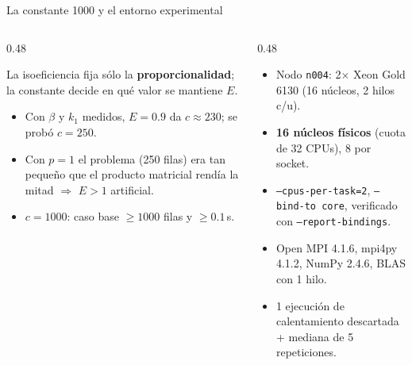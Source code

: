 \documentclass[10pt, aspectratio=169]{beamer}
\newcommand{\cajaInfo}[2]{%
  {\setlength{\fboxsep}{6pt}%
   \colorbox{UTECDarkBlue!5}{\begin{minipage}{\dimexpr#1-2\fboxsep\relax}#2\end{minipage}}}%
}
\newcommand{\cajaAcento}[2]{%
  {\setlength{\fboxsep}{6pt}%
   \colorbox{UTECCyan!10}{\begin{minipage}{\dimexpr#1-2\fboxsep\relax}#2\end{minipage}}}%
}
\newcommand{\encCaja}[1]{\textbf{\color{UTECDarkBlue}{#1}}\par\vspace{0.08cm}}
\begin{document}
\begin{frame}{La constante 1000 y el entorno experimental}
\footnotesize
\begin{columns}[T,onlytextwidth]
    \begin{column}{0.48\textwidth}
        \cajaInfo{\linewidth}{%
            \encCaja{¿De dónde sale el 1000?}
            La isoeficiencia fija sólo la \textbf{proporcionalidad}; la constante decide en qué valor
            se mantiene $E$.
            \begin{itemize}
                \item Con $\beta$ y $k_1$ medidos, $E=0.9$ da $c\approx230$; se probó $c=250$.
                \item Con $p=1$ el problema (250 filas) era tan pequeño que el producto matricial
                      rendía la mitad $\Rightarrow$ $E>1$ artificial.
                \item $c=1000$: caso base $\ge1000$ filas y $\ge0.1$\,s.
            \end{itemize}
        }
    \end{column}
    \begin{column}{0.48\textwidth}
        \cajaAcento{\linewidth}{%
            \encCaja{Entorno: clúster Khipu (UTEC)}
            \begin{itemize}
                \item Nodo \texttt{n004}: 2$\times$ Xeon Gold 6130 (16 núcleos, 2 hilos c/u).
                \item \textbf{16 núcleos físicos} (cuota de 32 CPUs), 8 por socket.
                \item \texttt{--cpus-per-task=2}, \texttt{--bind-to core}, verificado con
                      \texttt{--report-bindings}.
                \item Open MPI 4.1.6, mpi4py 4.1.2, NumPy 2.4.6, BLAS con 1 hilo.
                \item 1 ejecución de calentamiento descartada + mediana de 5 repeticiones.
            \end{itemize}
        }
    \end{column}
\end{columns}
\end{frame}
\end{document}

